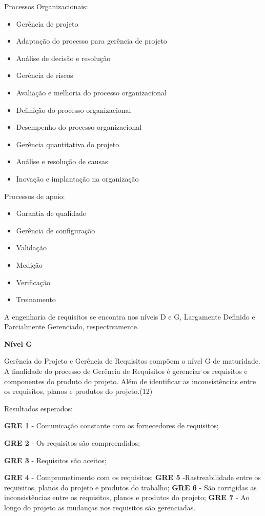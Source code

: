 \begin{itemize}
Processos Organizacionais:

\begin{itemize}
\item Gerência de projeto
\item Adaptação do processo para gerência de projeto
\item Análise de decisão e resolução
\item Gerência de riscos
\item Avaliação e melhoria do processo organizacional
\item Definição do processo organizacional
\item Desempenho do processo organizacional
\item Gerência quantitativa do projeto
\item Análise e resolução de causas
\item Inovação e implantação na organização
\end{itemize}

Processos de apoio:

\begin{itemize}
\item Garantia de qualidade
\item Gerência de configuração
\item Validação
\item Medição
\item Verificação
\item Treinamento
\end{itemize}

A engenharia de requisitos se encontra nos níveis D e G, Largamente Definido e Parcialmente Gerenciado, respectivamente.


\textbf{Nível G}

Gerência do Projeto e Gerência de Requisitos compõem o nível G de maturidade.
A finalidade do processo de Gerência de Requisitos é gerenciar os requisitos e componentes do produto do projeto. Além de identificar as inconsistências entre os requisitos, planos e produtos do projeto.(12)

Resultados esperados:

\textbf{GRE 1} - Comunicação constante com os fornecedores de requisitos;

\textbf{GRE 2} - Os requisitos são compreendidos;

\textbf{GRE 3} - Requisitos são aceitos;

\textbf{GRE 4} - Comprometimento com os requisitos;
\textbf{GRE 5} -Rastreabilidade entre os requisitos, planos do projeto e produtos do trabalho;
\textbf{GRE 6} - São corrigidas as inconsistências entre os requisitos, planos e produtos do projeto;
\textbf{GRE 7} - Ao longo do projeto as mudanças nos requisitos são gerenciadas.


\end{itemize}
